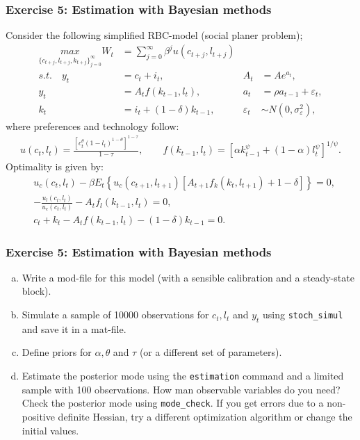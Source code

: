 \documentclass{beamer} %
\newcounter{saveenumi}
\newcommand{\seti}{\setcounter{saveenumi}{\value{enumi}}}
\begin{document}
\begin{frame}\frametitle{Exercise 5: Estimation with Bayesian methods}
Consider the following simplified RBC-model (social planer problem);
\begin{align*}
  \underset{\{c_{t+j},l_{t+j},k_{t+j}\}_{j=0}^\infty}{max} W_t &= \sum_{j=0}^\infty \beta^j u(c_{t+j},l_{t+j})\\
  s.t.\quad y_t &= c_t + i_t, & A_t &= A e^{a_t}, \\
  y_t &= A_t f(k_{t-1},l_t), & a_t &= \rho a_{t-1} + \varepsilon_t,\\
  k_t &= i_t +(1-\delta)k_{t-1}, &  \varepsilon_t &\sim N(0,\sigma_{\varepsilon}^2),
\end{align*}
where preferences and technology follow:
\begin{align*}
  u(c_t,l_t)= \frac{\left[c_t^\theta (1-l_t)^{1-\theta}\right]^{1-\tau}}{1-\tau}, \qquad f(k_{t-1},l_t)=\left[\alpha k_{t-1}^\psi + (1-\alpha)l_t^\psi\right]^{1/\psi}.
\end{align*}
Optimality is given by:
\begin{eqnarray*}
 &u_c(c_t,l_t) - \beta E_t \left\{u_c(c_{t+1},l_{t+1}) \left[A_{t+1} f_k(k_t, l_{t+1})+1-\delta \right]\right\} = 0,\\
 & -\frac{u_l(c_t,l_t)}{u_c(c_t,l_t)}-A_t f_l(k_{t-1},l_t)=0,\\
 & c_t + k_t -A_t f(k_{t-1},l_t) -(1-\delta)k_{t-1}=0.
\end{eqnarray*}
\end{frame}

\begin{frame}\frametitle{Exercise 5: Estimation with Bayesian methods}
\begin{enumerate}[(a)]
  \item Write a mod-file for this model (with a sensible calibration and a steady-state block).
  \item Simulate a sample of 10000 observations for $c_t,l_t$ and $y_t$ using \texttt{stoch\_simul} and save it in a mat-file.
  \item Define priors for $\alpha,\theta$ and $\tau$ (or a different set of parameters).
  \item Estimate the posterior mode using the \texttt{estimation} command and a limited sample with 100 observations. How man observable variables do you need? Check the posterior mode using \texttt{mode\_check}. If you get errors due to a non-positive definite Hessian, try a different optimization algorithm or change the initial values.
\seti
\end{enumerate}
\end{frame}
\end{document}
